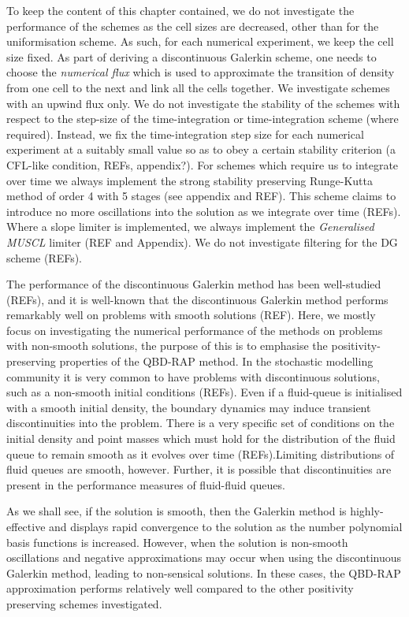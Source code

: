 To keep the content of this chapter contained, we do not investigate the performance of the schemes as the cell sizes are decreased, other than for the uniformisation scheme. As such, for each numerical experiment, we keep the cell size fixed. As part of deriving a discontinuous Galerkin scheme, one needs to choose the \emph{numerical flux} which is used to approximate the transition of density from one cell to the next and link all the cells together. We investigate schemes with an upwind flux only.
We do not investigate the stability of the schemes with respect to the step-size of the time-integration or time-integration scheme (where required). Instead, we fix the time-integration step size for each numerical experiment at a suitably small value so as to obey a certain stability criterion (a CFL-like condition, REFs, appendix?). For schemes which require us to integrate over time we always implement the strong stability preserving Runge-Kutta method of order 4 with 5 stages (see appendix and REF). This scheme claims to introduce no more oscillations into the solution as we integrate over time (REFs). Where a slope limiter is implemented, we always implement the \emph{Generalised MUSCL} limiter (REF and Appendix). We do not investigate filtering for the DG scheme (REFs).

The performance of the discontinuous Galerkin method has been well-studied (REFs), and it is well-known that the discontinuous Galerkin method performs remarkably well on problems with smooth solutions (REF). Here, we mostly focus on investigating the numerical performance of the methods on problems with non-smooth solutions, the purpose of this is to emphasise the positivity-preserving properties of the QBD-RAP method. In the stochastic modelling community it is very common to have problems with discontinuous solutions, such as a non-smooth initial conditions (REFs). Even if a fluid-queue is initialised with a smooth initial density, the boundary dynamics may induce transient discontinuities into the problem. There is a very specific set of conditions on the initial density and point masses which must hold for the distribution of the fluid queue to remain smooth as it evolves over time (REFs).Limiting distributions of fluid queues are smooth, however. Further, it is possible that discontinuities are present in the performance measures of fluid-fluid queues. 

As we shall see, if the solution is smooth, then the Galerkin method is highly-effective and displays rapid convergence to the solution as the number polynomial basis functions is increased. However, when the solution is non-smooth oscillations and negative approximations may occur when using the discontinuous Galerkin method, leading to non-sensical solutions. In these cases, the QBD-RAP approximation performs relatively well compared to the other positivity preserving schemes investigated.

